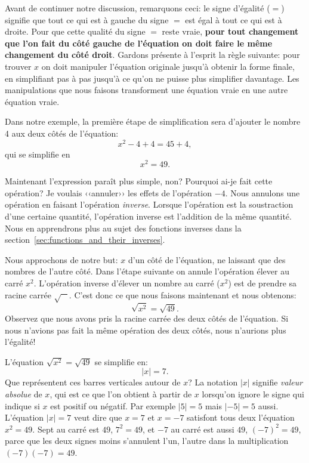 	Avant de continuer notre discussion, remarquons ceci:
	le signe d'égalité ($=$) signifie que tout ce qui est à gauche du signe $=$ est égal à tout ce qui est à droite.
        Pour que cette qualité  du signe $=$ reste vraie,
        \textbf{pour tout changement que l'on fait du côté gauche de l'équation on doit faire le même changement du côté droit}. 
	Gardons présente à l'esprit la règle suivante:
	pour trouver $x$ on doit manipuler l'équation originale jusqu'à obtenir la forme finale,
	en simplifiant pas à pas jusqu'à ce qu'on ne puisse plus simplifier davantage.
	Les manipulations que nous faisons transforment une équation vraie en une autre équation vraie. %

	Dans notre exemple,
	la première étape de simplification sera d'ajouter le nombre 4 aux deux côtés de l'équation:
	\[
	 	x^2-4  +4  		=	45    +4,
	\]
	qui se simplifie en
	\[
		x^2 	 		=	49.
	\]

	\noindent
	Maintenant l'expression paraît plus simple, non?
	Pourquoi ai-je fait cette opération? 
	Je voulais ‹‹annuler›› les effets de l'opération $-4$.
	Nous  annulons une opération en faisant l'opération \emph{inverse}.
	Lorsque l'opération est la soustraction d'une certaine quantité, l'opération inverse est l'addition de la même quantité.
	Nous en apprendrons plus au sujet des fonctions inverses dans la section~\ref{sec:functions_and_their_inverses}.

	Nous approchons de notre but:  $x$ d'un côté de l'équation,
	ne laissant que des nombres de l'autre côté.
	Dans l'étape suivante on annule l'opération élever au carré $x^2$.
	L'opération inverse d'élever un nombre au carré ($x^2$) est de prendre sa racine carrée $\sqrt{\phantom{a}\ }$.
	C'est donc ce que nous faisons maintenant et nous obtenons:
	\[ 
	   \sqrt{x^2} 		= 	\sqrt{49}.
	\]
	Observez que nous avons pris la racine carrée des deux côtés de l'équation.
	Si nous n'avions pas fait la même opération des deux côtés, nous n'aurions plus l'égalité!

	L'équation $\sqrt{x^2}= \sqrt{49}$ se simplifie en: 
	\[
	 	|x|	= 	7.
	\]
	Que représentent ces barres verticales autour de $x$?
	La notation $|x|$ signifie \emph{valeur absolue} de $x$,											
	qui est ce que l'on obtient à partir de $x$ lorsqu'on ignore le signe qui indique si $x$ est positif ou négatif. 
	Par exemple $|5|=5$ mais $|-5|=5$ aussi.
	L'équation $|x|=7$ veut dire que $x=7$ et $x=-7$ satisfont tous deux l'équation $x^2 = 49$.
	Sept au carré est $49$, $7^2=49$, et $-7$ au carré est aussi $49$, 
	$(-7)^2 = 49$,
	parce que les deux signes moins s'annulent l'un, l'autre dans la multiplication $(-7)(-7)=49$.

